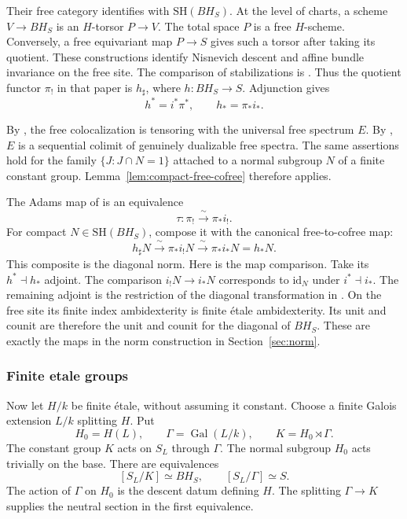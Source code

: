 \documentclass[11pt,reqno]{amsart}
\theoremstyle{definition}
\theoremstyle{remark}
\theoremstyle{plain}
\numberwithin{equation}{section}
\newcommand{\SH}{\mathrm{SH}}
\DeclareMathOperator{\Gal}{Gal}
\begin{document}
Their free category identifies with \(\SH(BH_S)\).
At the level of charts, a scheme \(V\to BH_S\) is an \(H\)-torsor \(P\to V\).
The total space \(P\) is a free \(H\)-scheme.
Conversely, a free equivariant map \(P \to S\) gives such a torsor after taking its quotient.
These constructions identify Nisnevich descent and affine bundle invariance on the free site.
The comparison of stabilizations is \cite[Theorem~5.2]{GH}.
Thus the quotient functor \(\pi_!\) in that paper is \(h_\sharp\), where \(h:BH_S\to S\).
Adjunction gives
\[
 h^*=i^*\pi^*,\qquad h_*=\pi_*i_*.
\]

By \cite[Proposition~3.11]{GH}, the free colocalization is tensoring with the universal free spectrum \(E\).
By \cite[Corollary~6.29]{GH}, \(E\) is a sequential colimit of genuinely dualizable free spectra.
The same assertions hold for the family
\(\{J:J\cap N=1\}\) attached to a normal subgroup \(N\) of a finite constant group.
Lemma~\ref{lem:compact-free-cofree} therefore applies.

The Adams map of \cite[Definition~6.4 and Theorem~6.33]{GH} is an equivalence
\[
 \tau:\pi_!\xrightarrow{\ \sim\ }\pi_*i_!.
\]
For compact \(N\in\SH(BH_S)\), compose it with the canonical free-to-cofree map:
\begin{equation}\label{eq:finite-ordinary}
 h_\sharp N\xrightarrow{\ \sim\ }\pi_*i_!N
 \xrightarrow{\ \sim\ }\pi_*i_*N=h_*N.
\end{equation}
This composite is the diagonal norm.
Here is the map comparison.
Take its \(h^*\dashv h_*\) adjoint.
The comparison \(i_!N\to i_*N\) corresponds to \(\mathrm{id}_N\) under \(i^*\dashv i_*\).
The remaining adjoint is the restriction of the diagonal transformation in \cite[Definition~6.4]{GH}.
On the free site its finite index ambidexterity is finite étale ambidexterity.
Its unit and counit are therefore the unit and counit for the diagonal of \(BH_S\).
These are exactly the maps in the norm construction in Section~\ref{sec:norm}.

\subsubsection*{Finite etale groups}
Now let \(H/k\) be finite étale, without assuming it constant.
Choose a finite Galois extension \(L/k\) splitting \(H\).
Put
\[
 H_0=H(L),\qquad \Gamma=\Gal(L/k),\qquad K=H_0\rtimes\Gamma.
\]
The constant group \(K\) acts on \(S_L\) through \(\Gamma\).
The normal subgroup \(H_0\) acts trivially on the base.
There are equivalences
\begin{equation}\label{eq:galois-presentations}
 [S_L/K]\simeq BH_S,\qquad [S_L/\Gamma]\simeq S.
\end{equation}
The action of \(\Gamma\) on \(H_0\) is the descent datum defining \(H\).
The splitting \(\Gamma\to K\) supplies the neutral section in the first equivalence.
\end{document}
